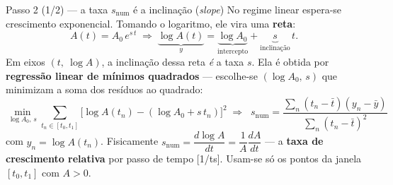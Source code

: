 \documentclass[aspectratio=169,11pt]{beamer}
\newcommand{\snum}{s_{\mathrm{num}}}
\begin{document}
\begin{frame}{Passo 2 (1/2) — a taxa $\snum$ é a inclinação (\emph{slope})}
  No regime linear espera-se crescimento exponencial. Tomando o logaritmo,
  ele vira uma \textbf{reta}:
  \begin{equation*}
    A(t) = A_0\,e^{s\,t}
    \;\Longrightarrow\;
    \underbrace{\log A(t)}_{y} = \underbrace{\log A_0}_{\text{intercepto}}
    + \underbrace{s}_{\text{inclinação}}\,t .
  \end{equation*}
  Em eixos $(t,\ \log A)$, a inclinação dessa reta \emph{é} a taxa $s$. Ela é
  obtida por \textbf{regressão linear de mínimos quadrados} — escolhe-se
  $(\log A_0,\,s)$ que minimizam a soma dos resíduos ao quadrado:
  \begin{equation*}
    \min_{\log A_0,\,s}\sum_{t_n\in[t_0,t_1]}
    \big[\log A(t_n) - (\log A_0 + s\,t_n)\big]^2
    \;\Rightarrow\;
    \boxed{\;\snum = \frac{\sum_n (t_n-\bar t)(y_n-\bar y)}{\sum_n (t_n-\bar t)^2}\;}
  \end{equation*}
  \footnotesize
  com $y_n=\log A(t_n)$. Fisicamente $\snum = \dfrac{d\log A}{dt}
  = \dfrac{1}{A}\dfrac{dA}{dt}$ — a \textbf{taxa de crescimento relativa} por
  passo de tempo [1/ts]. Usam-se só os pontos da janela $[t_0,t_1]$ com $A>0$.
\end{frame}
\end{document}
